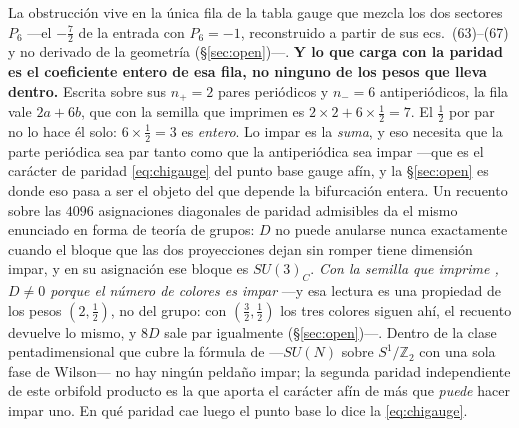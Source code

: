 \documentclass[11pt,a4paper]{article}
\newcommand{\ZZ}{\mathbb{Z}}
\newcommand{\su}[1]{SU(#1)}
\begin{document}
\noindent La obstrucción vive en la única fila de la tabla gauge que mezcla los dos sectores $P_6$
---el $-\tfrac72$ de la entrada con $P_6=-1$, reconstruido a partir de sus ecs.~(63)--(67) y no
derivado de la geometría (\S\ref{sec:open})---. \textbf{Y lo que carga con la paridad es el
coeficiente entero de esa fila, no ninguno de los pesos que lleva dentro.} Escrita sobre sus
$n_+=2$ pares periódicos y $n_-=6$ antiperiódicos, la fila vale $2a+6b$, que con la semilla que
\cite{KM25} imprimen es $2\times2+6\times\tfrac12=7$. El $\tfrac12$ por par no lo hace él solo:
$6\times\tfrac12=3$ es \emph{entero}. Lo impar es la \emph{suma}, y eso necesita que la parte
periódica sea par tanto como que la antiperiódica sea impar ---que es el carácter de paridad
\eqref{eq:chigauge} del punto base gauge afín, y la \S\ref{sec:open} es donde eso pasa a ser el
objeto del que depende la bifurcación entera. Un recuento sobre las $4096$ asignaciones
diagonales de paridad admisibles da el mismo enunciado en forma de teoría de grupos: $D$ no puede
anularse nunca exactamente cuando el bloque que las dos proyecciones dejan sin romper tiene
dimensión impar, y en su asignación ese bloque es $\su3_C$. \emph{Con la semilla que imprime
\cite{KM25}, $D\neq0$ porque el número de colores es impar} ---y esa lectura es una propiedad de
los pesos $(2,\tfrac12)$, no del grupo: con $(\tfrac32,\tfrac12)$ los tres colores siguen ahí, el
recuento devuelve lo mismo, y $8D$ sale par igualmente (\S\ref{sec:open})---. Dentro de la clase pentadimensional
que cubre la fórmula de \cite{HY04} ---$\su{N}$ sobre $S^1/\ZZ_2$ con una sola fase de Wilson--- no
hay ningún peldaño impar; la segunda paridad independiente de este orbifold producto es la que
aporta el carácter afín de más que \emph{puede} hacer impar uno. En qué paridad cae luego el punto
base lo dice la \eqref{eq:chigauge}.
\end{document}
